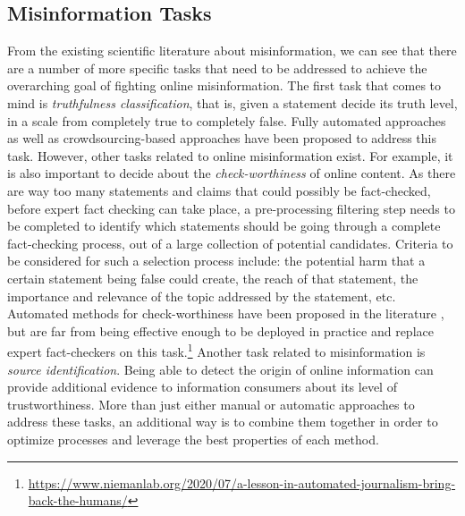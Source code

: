 \documentclass[11pt]{article}
\begin{document}
\subsection{Misinformation Tasks}
From the existing scientific literature about misinformation, we can see that there are a number of more specific tasks that need to be addressed to achieve the overarching goal of fighting online misinformation. The first task that comes to mind is  \textit{truthfulness classification}, that is, given a statement decide its truth level, in a scale from completely true to completely false. Fully automated approaches \cite{miranda2019automated} as well as crowdsourcing-based approaches \cite{roitero2020can} have been proposed to address this task.
% 
However, other tasks  related to online misinformation exist. For example, it is also important to decide  about the \textit{check-worthiness} of online content. As there are way too many statements and claims that could possibly be fact-checked, before expert fact checking can take place, a pre-processing filtering step needs to be completed to identify which statements should be going through a complete fact-checking process, out of a large collection of potential candidates.
Criteria to be considered for such a selection process include: the potential harm that a certain statement being false could create, the reach of that statement, the importance and relevance of the topic addressed by the statement, etc.
Automated methods for check-worthiness have been proposed in the literature \cite{checkthat}, but are far from being effective enough to be deployed in practice and replace expert fact-checkers on this task.\footnote{\url{https://www.niemanlab.org/2020/07/a-lesson-in-automated-journalism-bring-back-the-humans/}}
% 
Another task related to misinformation is \textit{source identification}. Being able to detect the origin of online information can provide additional evidence to information consumers about  its level of trustworthiness.
% 
More than just either manual or automatic approaches to address these tasks, an additional way is to combine them together in order to optimize processes and leverage the best properties of each method.
\end{document}
